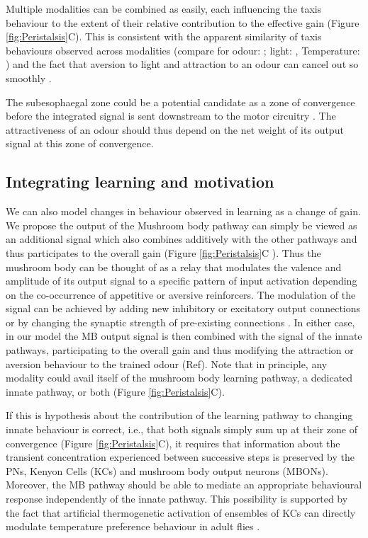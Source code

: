 \documentclass[11pt,a4paper]{article}
\begin{document}
Multiple modalities can be combined as easily, each influencing the taxis behaviour to the extent of their relative contribution to the effective gain (Figure \ref{fig:Peristalsis}C). This is consistent with the apparent similarity of taxis behaviours observed across modalities (compare for odour: \citep{gomez2011active}; light: \cite{kane2013sensorimotor},   Temperature: \cite{lahiri2011two}) and the fact that aversion to light and attraction to an odour can cancel out so smoothly \cite{bellmann2010optogenetically}. 

The subesophaegal zone could be a potential candidate as a zone of convergence before the integrated signal is sent downstream to the motor circuitry \cite{tastekin2015role}. The attractiveness of an odour should thus depend on the net weight of its output signal at this zone of convergence.  


\subsection{Integrating learning and motivation}
We can also model changes in behaviour observed in learning as a change of gain. We propose the output of the Mushroom body pathway \citep{gerber2004engram} can simply be viewed as an additional signal which also combines additively with the other pathways and thus participates to the overall gain (Figure \ref{fig:Peristalsis}C ). Thus the mushroom body can be thought of as a relay that modulates the valence and amplitude of its output signal to a specific pattern of input activation depending on the co-occurrence of appetitive or aversive reinforcers. The modulation of the signal can be achieved by adding new inhibitory or excitatory output connections or by changing the synaptic strength of pre-existing connections \citep{aso2014neuronal}. In either case, in our model the MB output signal is then combined with the signal of the innate pathways, participating to the overall gain and thus modifying the attraction or aversion behaviour to the trained odour (Ref). Note that in principle, any modality could avail itself of the mushroom body learning pathway, a dedicated innate pathway, or both (Figure \ref{fig:Peristalsis}C). 

If this is hypothesis about the contribution of the learning pathway to changing innate behaviour is correct, i.e., that both signals simply sum up at their zone of convergence (Figure \ref{fig:Peristalsis}C), it requires that information about the transient concentration experienced between successive steps is preserved by the PNs, Kenyon Cells (KCs) and mushroom body output neurons (MBONs). Moreover, the MB pathway should be able to mediate an appropriate behavioural response independently of the innate pathway. This possibility is supported by the fact that artificial thermogenetic activation of ensembles of KCs can directly modulate temperature preference behaviour in adult flies \citep{vasmer2014induction}. 
\end{document}
